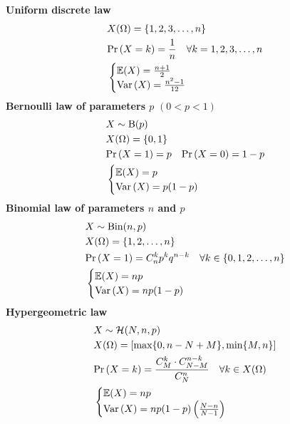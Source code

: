 \documentclass{report}
\begin{document}
\begin{enumerate}
	\ii \textbf{Uniform discrete law}
	\begin{align*}
		 & X(\Omega)= \{1,2,3,\dots,n\}                        \\
		 & \mathrm{Pr}\left( X=k \right) = \frac{1}{n}\quad\forall k =1,2,3,\dots,n \\
		 & \begin{cases}
			   \mathbb{E}(X) = \frac{n+1}{2} \\
			   \mathrm{Var}\left( X \right) = \frac{n^2-1}{12}
		   \end{cases}
	\end{align*}
	\ii \textbf{Bernoulli law of parameters $p$} $(0<p<1)$
	\begin{align*}
		 & X \sim \mathrm{B}(p)              \\
		 & X(\Omega) = \{0,1\}               \\
		 & \mathrm{Pr}\left( X=1 \right) = p \quad \mathrm{Pr}\left( X=0 \right) = 1-p \\
		 & \begin{cases}
			   \mathbb{E}(X) = p \\
			   \mathrm{Var}\left( X \right) = p(1-p)
		   \end{cases}
	\end{align*}
	\ii \textbf{Binomial law of parameters $n$ and $p$}
	\begin{align*}
		 & X \sim \mathrm{Bin}(n,p)                                      \\
		 & X(\Omega) = \{1,2,\dots,n\}                                   \\
		 & \mathrm{Pr}\left( X=1 \right) = C^k_n p^kq^{n-k}\quad\forall k\in\{0,1,2,\dots,n\} \\
		 & \begin{cases}
			   \mathbb{E}(X) = np \\
			   \mathrm{Var}\left( X \right) = np(1-p)
		   \end{cases}
	\end{align*}
	\ii \textbf{Hypergeometric law}
	\begin{align*}
		 & X \sim \mathcal{H}(N,n,p)                                                     \\
		 & X(\Omega) = [\max\{0,n-N+M\},\min\{M,n\}]                                     \\
		 & \Pr{X=k} = \frac{C^k_M \cdot C^{n-k}_{N-M}}{C^n_N}\quad\forall k\in X(\Omega) \\
		 & \begin{cases}
			   \EE(X) = np \\
			   \Var{X} = np(1-p)\lt(\frac{N-n}{N-1}\rt)
		   \end{cases}

\end{align*}
\end{enumerate}
\end{document}
